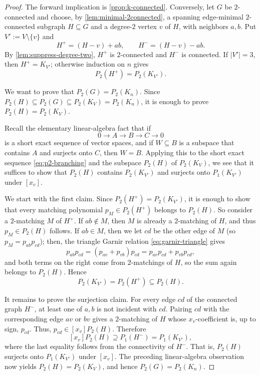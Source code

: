 \documentclass[12pt]{amsart}
\theoremstyle{definition}
\theoremstyle{remark}
\begin{document}
\begin{proof}
The forward implication is \cref{prop:k-connected}.  Conversely, let $G$ be
$2$-con\-nected and choose, by \cref{lem:minimal-2connected}, a spanning
edge-minimal $2$-connected subgraph $H\subseteq G$ and a degree-$2$
vertex $v$ of $H$, with neighbors $a,b$.  Put $V':=V\setminus\{v\}$ and
\[
 H^+=(H-v)+ab,
 \qquad
 H^-=(H-v)-ab.
\]
By \cref{lem:suppress-degree-two}, $H^+$ is $2$-connected and $H^-$ is
connected.  If $|V'|=3$, then $H^+=K_{V'}$; otherwise induction on $n$ gives
\[
 P_2(H^+)=P_2(K_{V'}).
\]

We want to prove that $P_2(G)=P_2(K_n)$.  Since
$P_2(H)\subseteq P_2(G)\subseteq P_2(K_V) = P_2(K_n)$, it is enough to prove
$P_2(H)=P_2(K_V)$.

Recall the elementary
linear-algebra fact that if
\[
 0\longrightarrow A\longrightarrow B\longrightarrow C\longrightarrow0
\]
is a short exact sequence of vector spaces,
and if $W\subseteq B$ is a subspace that contains $A$
and surjects onto $C$, then $W=B$.
Applying this to the short exact sequence \eqref{eq:p2-branching}
and the subspace $P_2(H)$ of $P_2(K_V)$, we see that
it suffices to show that $P_2(H)$ contains
$P_2(K_{V'})$ and surjects onto $P_1(K_{V'})$ under $[x_v]$.

We start with the first claim.  Since $P_2(H^+)=P_2(K_{V'})$, it is enough to
show that every matching polynomial $p_M \in P_2(H^+)$ belongs to $P_2(H)$.
So consider a $2$-matching $M$ of $H^+$.
If $ab \notin M$, then $M$ is already a $2$-matching of $H$,
and thus $p_M \in P_2(H)$ follows.  If
$ab \in M$, then we let $cd$ be the other edge of $M$
(so $p_M = p_{ab}p_{cd}$); then, %
the triangle Garnir relation \eqref{eq:garnir-triangle} gives
\[
 p_{ab}p_{cd}
 =(p_{av}+p_{vb})p_{cd}
 =p_{av}p_{cd}+p_{vb}p_{cd},
\]
and both terms on the right come from $2$-matchings of $H$,
so the sum again belongs to $P_2(H)$.
Hence
\[
 P_2(K_{V'})=P_2(H^+)\subseteq P_2(H).
\]

It remains to prove the surjection claim.
For every edge $cd$ of the connected graph
$H^-$, at least one of $a,b$ is not incident with $cd$.  Pairing $cd$ with
the corresponding edge $av$ or $bv$ gives a $2$-matching of $H$ whose
$x_v$-coefficient is, up to sign, $p_{cd}$.  Thus,
$p_{cd} \in [x_v]P_2(H)$.
Therefore
\[
 [x_v]P_2(H)\supseteq P_1(H^-)=P_1(K_{V'}),
\]
where the last equality follows from the connectivity of $H^-$.
That is, $P_2(H)$ surjects onto $P_1(K_{V'})$ under $[x_v]$.
The preceding
linear-algebra observation now yields $P_2(H)=P_2(K_V)$, and hence
$P_2(G)=P_2(K_n)$.
\end{proof}
\end{document}
